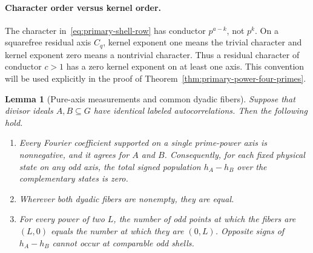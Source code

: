 \documentclass[11pt]{article}
\numberwithin{equation}{section}
\newtheorem{lemma}[theorem]{Lemma}
\theoremstyle{definition}
\theoremstyle{remark}
\begin{document}
\paragraph{Character order versus kernel order.}
The character in~\eqref{eq:primary-shell-row} has conductor
\(p^{a-k}\), not \(p^k\). On a squarefree residual axis \(C_q\),
kernel exponent one means the trivial character and kernel exponent zero
means a nontrivial character. Thus a residual character of conductor
\(c>1\) has a zero kernel exponent on at least one axis. This convention
will be used explicitly in the proof of Theorem~\ref{thm:primary-power-four-primes}.

\begin{lemma}[Pure-axis measurements and common dyadic fibers]
\label{lem:common-dyadic-fibers}
Suppose that divisor ideals \(A,B\subseteq G\) have identical labeled
autocorrelations. Then the following hold.
\begin{enumerate}
\item Every Fourier coefficient supported on a single prime-power axis
is nonnegative, and it agrees for \(A\) and \(B\).
Consequently, for each fixed physical state on any odd axis, the total
signed population \(h_A-h_B\) over the complementary states is zero.
\item Wherever both dyadic fibers are nonempty, they are equal.
\item For every power of two \(L\), the number of odd points at which
the fibers are \((L,0)\) equals the number at which they are \((0,L)\).
Opposite signs of \(h_A-h_B\) cannot occur at comparable odd shells.
\end{enumerate}
\end{lemma}
\end{document}
